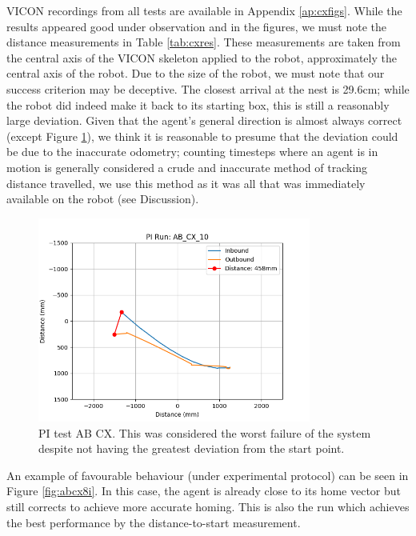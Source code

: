 \documentclass[a4paper,11pt,twoside,openright]{article}
\begin{document}
VICON recordings from all tests are available in Appendix
\ref{ap:cxfigs}. While the results appeared good under observation and
in the figures, we must note the distance measurements in Table
\ref{tab:cxres}. These measurements are taken from the central axis of
the VICON skeleton applied to the robot, approximately the central axis
of the robot. Due to the size of the robot, we must note that our
success criterion may be deceptive. The closest arrival at the nest is
29.6cm; while the robot did indeed make it back to its starting box,
this is still a reasonably large deviation. Given that the agent's
general direction is almost always correct (except Figure
\ref{fig:abcx10i}), we think it is reasonable to presume that the deviation
could be due to the inaccurate odometry; counting timesteps where an
agent is in motion is generally considered a crude and inaccurate
method of tracking distance travelled, we use this method as it was
all that was immediately available on the robot (see Discussion).
\newline\par

\begin{figure}[h!]
  \centering
  \includegraphics[width=0.8\textwidth]{AB_CX_10}
  \caption{\label{fig:abcx10i} PI test AB\textunderscore
    CX. This was considered the worst failure of the
  system despite not having the greatest deviation from the start point.}
\end{figure}

An example of favourable behaviour (under experimental protocol) can
be seen in Figure \ref{fig:abcx8i}. In this case, the agent is already
close to its home vector but still corrects to achieve more accurate
homing. This is also the run which achieves the best performance by
the distance-to-start measurement.
\newline\par
\end{document}
